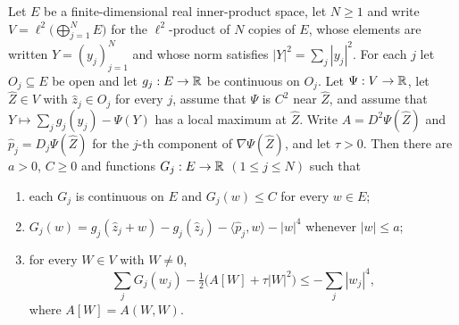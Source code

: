 \begin{lemma}
Let $E$ be a finite-dimensional real inner-product space, let $N\ge1$ and write
$V=\ell^2\bigl(\bigoplus_{j=1}^NE\bigr)$ for the $\ell^2$-product of $N$ copies
of $E$, whose elements are written $Y=(y_j)_{j=1}^N$ and whose norm satisfies
$|Y|^2=\sum_j|y_j|^2$. For each $j$ let $O_j\subseteq E$ be open and let
$g_j:E\to\mathbb{R}$ be continuous on $O_j$. Let $\Psi:V\to\mathbb{R}$, let $\widehat Z\in V$
with $\widehat z_j\in O_j$ for every $j$, assume that $\Psi$ is $C^2$ near
$\widehat Z$, and assume that $Y\mapsto\sum_jg_j(y_j)-\Psi(Y)$ has a local
maximum at $\widehat Z$. Write $A=D^2\Psi(\widehat Z)$ and
$\widehat p_j=D_j\Psi(\widehat Z)$ for the $j$-th component of
$\nabla\Psi(\widehat Z)$, and let $\tau>0$. Then there are $a>0$, $C\ge0$ and
functions $G_j:E\to\mathbb{R}$ $(1\le j\le N)$ such that
\begin{enumerate}
\item[(G1)] each $G_j$ is continuous on $E$ and $G_j(w)\le C$ for every $w\in E$;
\item[(G2)] $G_j(w)=g_j(\widehat z_j+w)-g_j(\widehat z_j)
  -\langle\widehat p_j,w\rangle-|w|^4$ whenever $|w|\le a$;
\item[(G3)] for every $W\in V$ with $W\ne0$,
  \[
    \sum_jG_j(w_j)-\tfrac12\bigl(A[W]+\tau|W|^2\bigr)\le-\sum_j|w_j|^4 ,
  \]
  where $A[W]=A(W,W)$.
\end{enumerate}
\end{lemma}
